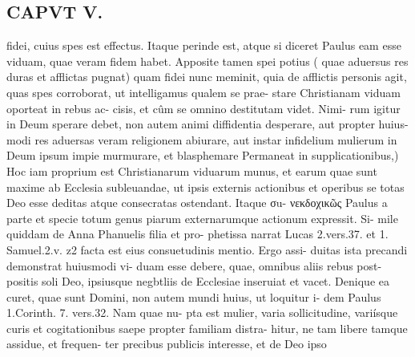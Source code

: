 \documentclass{article}
\begin{document}
\begin{pages}
\section*{CAPVT  V. }
\marginpar{[ p.29 ]}fidei, cuius spes est effectus. Itaque perinde est, atque si diceret Paulus eam esse viduam, quae veram fidem habet. Apposite tamen spei potius ( quae aduersus res duras et afflictas pugnat) quam fidei nunc meminit, quia de afflictis personis agit, quas spes corroborat, ut intelligamus qualem se prae- stare Christianam viduam oporteat in rebus ac- cisis, et cûm se omnino destitutam videt. Nimi- rum igitur in Deum sperare debet, non autem animi diffidentia desperare, aut propter huius- modi res aduersas veram religionem abiurare, aut instar infidelium mulierum in Deum ipsum impie murmurare, et blasphemare Permaneat in supplicationibus,) Hoc iam proprium est Christianarum viduarum munus, et earum quae sunt maxime ab Ecclesia subleuandae, ut ipsis externis actionibus et operibus se totas Deo esse deditas atque consecratas ostendant. Itaque σu- νεκδοχικῶς Paulus a parte et specie totum genus piarum externarumque actionum expressit. Si- mile quiddam de Anna Phanuelis filia et pro- phetissa narrat Lucas 2.vers.37. et 1. Samuel.2.v. z2 facta est eius consuetudinis mentio. Ergo assi- duitas ista precandi demonstrat huiusmodi vi- duam esse debere, quae, omnibus aliis rebus post- positis soli Deo, ipsiusque negbtliis de Ecclesiae inseruiat et vacet. Denique ea curet, quae sunt Domini, non autem mundi huius, ut loquitur i- dem Paulus 1.Corinth. 7. vers.32. Nam quae nu- pta est mulier, varia sollicitudine, variísque curis et cogitationibus saepe propter familiam distra- hitur, ne tam libere tamque assidue, et frequen- ter precibus publicis interesse, et de Deo ipso 

\end{pages}
\end{document}
